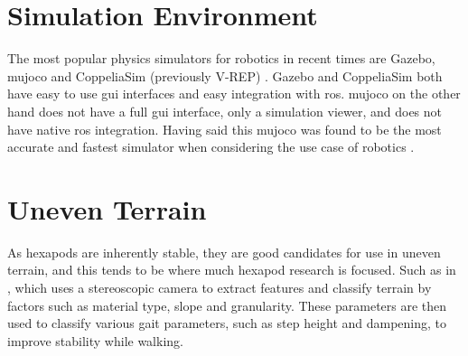 



\section{Simulation Environment} \label{sec:sim_research}

The most popular physics simulators for robotics in recent times are Gazebo, \ac{mujoco} and CoppeliaSim (previously V-REP) \citep{Collins-2021}.
Gazebo and CoppeliaSim both have easy to use \ac{gui} interfaces and easy integration with \ac{ros}. \ac{mujoco} on the other hand does not have
a full \ac{gui} interface, only a simulation viewer, and does not have native \ac{ros} integration. Having said this \ac{mujoco} was found to be
the most accurate and fastest simulator when considering the use case of robotics \citep{Erez-2015}.

\section{Uneven Terrain}
    As hexapods are inherently stable, they are good candidates for use in uneven terrain, and this tends to be where much hexapod research is focused.
    Such as in \cite{homberger2017terrain}, which uses a stereoscopic camera to extract features and classify terrain by factors such as material type,
    slope and granularity. These parameters are then used to classify various gait parameters, such as step height and dampening, to improve stability while
    walking.

